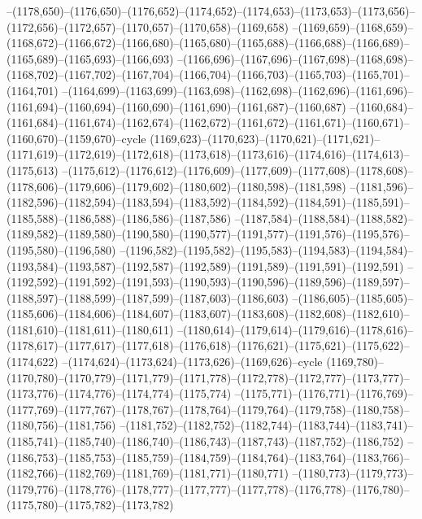 --(1178,650)--(1176,650)--(1176,652)--(1174,652)--(1174,653)--(1173,653)--(1173,656)--(1172,656)--(1172,657)--(1170,657)--(1170,658)--(1169,658)
--(1169,659)--(1168,659)--(1168,672)--(1166,672)--(1166,680)--(1165,680)--(1165,688)--(1166,688)--(1166,689)--(1165,689)--(1165,693)--(1166,693)
--(1166,696)--(1167,696)--(1167,698)--(1168,698)--(1168,702)--(1167,702)--(1167,704)--(1166,704)--(1166,703)--(1165,703)--(1165,701)--(1164,701)
--(1164,699)--(1163,699)--(1163,698)--(1162,698)--(1162,696)--(1161,696)--(1161,694)--(1160,694)--(1160,690)--(1161,690)--(1161,687)--(1160,687)
--(1160,684)--(1161,684)--(1161,674)--(1162,674)--(1162,672)--(1161,672)--(1161,671)--(1160,671)--(1160,670)--(1159,670)--cycle
(1169,623)--(1170,623)--(1170,621)--(1171,621)--(1171,619)--(1172,619)--(1172,618)--(1173,618)--(1173,616)--(1174,616)--(1174,613)--(1175,613)
--(1175,612)--(1176,612)--(1176,609)--(1177,609)--(1177,608)--(1178,608)--(1178,606)--(1179,606)--(1179,602)--(1180,602)--(1180,598)--(1181,598)
--(1181,596)--(1182,596)--(1182,594)--(1183,594)--(1183,592)--(1184,592)--(1184,591)--(1185,591)--(1185,588)--(1186,588)--(1186,586)--(1187,586)
--(1187,584)--(1188,584)--(1188,582)--(1189,582)--(1189,580)--(1190,580)--(1190,577)--(1191,577)--(1191,576)--(1195,576)--(1195,580)--(1196,580)
--(1196,582)--(1195,582)--(1195,583)--(1194,583)--(1194,584)--(1193,584)--(1193,587)--(1192,587)--(1192,589)--(1191,589)--(1191,591)--(1192,591)
--(1192,592)--(1191,592)--(1191,593)--(1190,593)--(1190,596)--(1189,596)--(1189,597)--(1188,597)--(1188,599)--(1187,599)--(1187,603)--(1186,603)
--(1186,605)--(1185,605)--(1185,606)--(1184,606)--(1184,607)--(1183,607)--(1183,608)--(1182,608)--(1182,610)--(1181,610)--(1181,611)--(1180,611)
--(1180,614)--(1179,614)--(1179,616)--(1178,616)--(1178,617)--(1177,617)--(1177,618)--(1176,618)--(1176,621)--(1175,621)--(1175,622)--(1174,622)
--(1174,624)--(1173,624)--(1173,626)--(1169,626)--cycle
(1169,780)--(1170,780)--(1170,779)--(1171,779)--(1171,778)--(1172,778)--(1172,777)--(1173,777)--(1173,776)--(1174,776)--(1174,774)--(1175,774)
--(1175,771)--(1176,771)--(1176,769)--(1177,769)--(1177,767)--(1178,767)--(1178,764)--(1179,764)--(1179,758)--(1180,758)--(1180,756)--(1181,756)
--(1181,752)--(1182,752)--(1182,744)--(1183,744)--(1183,741)--(1185,741)--(1185,740)--(1186,740)--(1186,743)--(1187,743)--(1187,752)--(1186,752)
--(1186,753)--(1185,753)--(1185,759)--(1184,759)--(1184,764)--(1183,764)--(1183,766)--(1182,766)--(1182,769)--(1181,769)--(1181,771)--(1180,771)
--(1180,773)--(1179,773)--(1179,776)--(1178,776)--(1178,777)--(1177,777)--(1177,778)--(1176,778)--(1176,780)--(1175,780)--(1175,782)--(1173,782)
